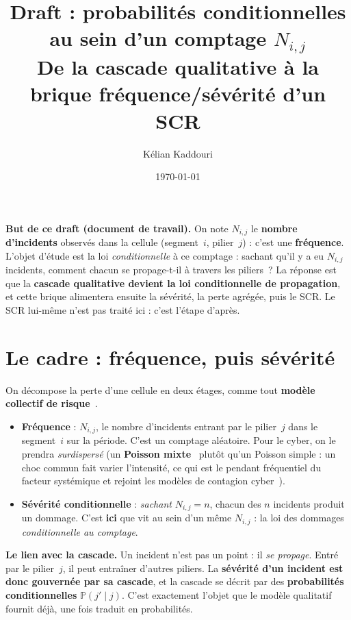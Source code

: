 \documentclass[11pt,a4paper]{article}
\title{\vspace{-1.2cm}\color{navy}\bfseries Draft : probabilités conditionnelles au sein d'un comptage $N_{i,j}$\\[2pt]
  \large De la cascade qualitative à la brique fréquence/sévérité d'un SCR}
\author{Kélian Kaddouri}
\date{\today}
\begin{document}
\maketitle
\vspace{-0.5cm}

\begin{cle}
\textbf{But de ce draft (document de travail).} On note $N_{i,j}$ le \textbf{nombre d'incidents}
observés dans la cellule (segment~$i$, pilier~$j$) : c'est une \textbf{fréquence}. L'objet
d'étude est la loi \emph{conditionnelle} à ce comptage : \og{}sachant qu'il y a eu $N_{i,j}$
incidents, comment chacun se propage-t-il à travers les piliers~?\fg{} La réponse est que la
\textbf{cascade qualitative devient la loi conditionnelle de propagation}, et cette brique
alimentera ensuite la sévérité, la perte agrégée, puis le SCR. Le SCR lui-même n'est pas traité
ici : c'est l'étape d'après.
\end{cle}

\section{Le cadre : fréquence, puis sévérité}

On décompose la perte d'une cellule en deux étages, comme tout \textbf{modèle collectif de
risque}~\cite{Buhlmann1970,KlugmanPanjerWillmot,Mikosch2009}.
\begin{itemize}[leftmargin=1.4em,itemsep=1pt]
\item \textbf{Fréquence} : $N_{i,j}$, le nombre d'incidents entrant par le pilier~$j$ dans le
  segment~$i$ sur la période. C'est un comptage aléatoire. Pour le cyber, on le prendra
  \emph{surdispersé} (un \textbf{Poisson mixte}~\cite{Grandell1997} plutôt qu'un Poisson simple :
  un choc commun fait varier l'intensité, ce qui est le pendant fréquentiel du facteur
  systémique et rejoint les modèles de contagion cyber~\cite{BessyRolandBoumezouedHillairet2021,HillairetLopez2021}).
\item \textbf{Sévérité conditionnelle} : \emph{sachant} $N_{i,j}=n$, chacun des $n$ incidents
  produit un dommage. C'est \textbf{ici} que vit \og{}au sein d'un même $N_{i,j}$\fg{} : la loi
  des dommages \emph{conditionnelle au comptage}.
\end{itemize}

\begin{cle}
\textbf{Le lien avec la cascade.} Un incident n'est pas un point : il \emph{se propage}. Entré
par le pilier~$j$, il peut entraîner d'autres piliers. La \textbf{sévérité d'un incident est
donc gouvernée par sa cascade}, et la cascade se décrit par des \textbf{probabilités
conditionnelles} $\mathbb P(j' \mid j)$. C'est exactement l'objet que le modèle qualitatif
fournit déjà, une fois traduit en probabilités.
\end{cle}
\end{document}
